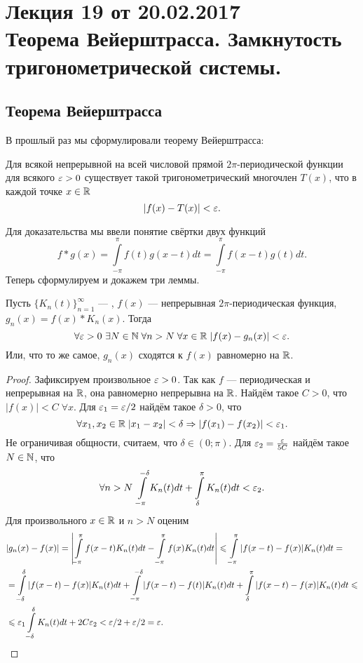\pagestyle{fancy}
\section{Лекция 19 от 20.02.2017 \\  Теорема Вейерштрасса. Замкнутость тригонометрической системы.}
\subsection{Теорема Вейерштрасса}
В прошлый раз мы сформулировали теорему Вейерштрасса:
\begin{Theorem}
	Для всякой непрерывной на всей числовой прямой $2\pi$-периодической функции для всякого $\varepsilon>0$ существует такой тригонометрический многочлен $T(x)$, что в каждой точке $x \in \mathbb{R}$ $$
	 |f(x)-T(x)| < \varepsilon.
	$$
\end{Theorem}
	Для доказательства мы ввели понятие свёртки двух функций
	$$
		f*g(x) = \int\limits_{-\pi}^{\pi} f(t)g(x-t)dt = \int\limits_{-\pi}^{\pi}f(x-t)g(t)dt.
	$$
	Теперь сформулируем и докажем три леммы.
\begin{Lemma}
	Пусть $\{K_n(t)\}_{n=1}^{\infty}$ --- \lmao, $f(x)$ --- непрерывная $2\pi$-периодическая функция, $g_n(x) = f(x)*K_n(x)$. Тогда 
	$$
		\forall \varepsilon>0\ \exists N\in \mathbb{N}\; \forall n>N\; \forall x\in\mathbb{R}\; |f(x) - g_n(x)| < \varepsilon.
	$$
	Или, что то же самое, $g_n(x)$ сходятся к $f(x)$ равномерно на $\mathbb{R}$.
	\begin{proof}
		Зафиксируем произвольное $\varepsilon > 0$. Так как $f$ --- периодическая и непрерывная на $\mathbb{R}$, она равномерно непрерывна на $\mathbb{R}$. Найдём такое $C>0$, что $|f(x)| <C\; \forall x$. Для $\varepsilon_1 = \varepsilon/2$ найдём такое $\delta > 0$, что
		$$
			\forall x_1, x_2\in  \mathbb{R}\; |x_1-x_2| < \delta \Rightarrow |f(x_1) - f(x_2)| < \varepsilon_1.
		$$
		Не ограничивая общности, считаем, что $\delta \in (0; \pi)$.
		Для $\varepsilon_2 = \frac{\varepsilon}{5C}$ найдём такое $N\in \mathbb{N}$, что
		$$
			\forall n>N\; \int\limits_{-\pi}^{-\delta}  K_n(t)dt+ \int\limits_{\delta}^{\pi} K_n(t)dt < \varepsilon_2.
		$$
		Для произвольного $x\in \mathbb{R}$ и $n >N$ оценим
		\begin{align*}
			&|g_n(x) - f(x)|= \left| \int \limits_{-\pi}^{\pi}f(x-t)K_n(t)dt - \int \limits_{-\pi}^{\pi}f(x)K_n(t)dt\right| \leqslant \int \limits_{-\pi}^{\pi}|f(x-t) -f(x)|K_n(t) dt =\\&= \int \limits_{-\delta}^{\delta}|f(x-t) - f(x)|K_n(t)dt + \int \limits_{-\pi}^{-\delta}|f(x-t) - f(t)|K_n(t)dt + \int \limits_{\delta}^{\pi}|f(x-t) - f(x)|K_n(t)dt \leqslant \\ &\leqslant
			\varepsilon_1 \int \limits_{-\delta}^{\delta}K_n(t)dt + 2C\varepsilon_2 < \varepsilon/2 + \varepsilon/2 = \varepsilon.
		\end{align*}
	\end{proof}
\end{Lemma}
